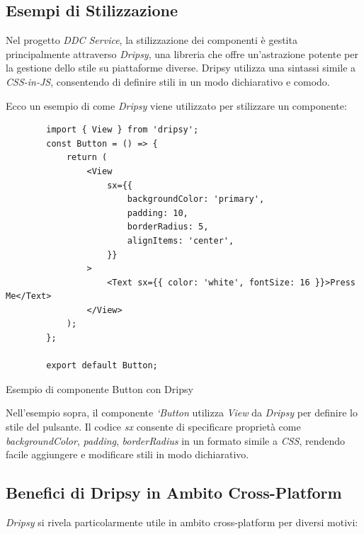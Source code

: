 \subsection{Esempi di Stilizzazione}

Nel progetto \textit{DDC Service}, la stilizzazione dei componenti è gestita principalmente attraverso \textit{Dripsy},
 una libreria che offre un'astrazione potente per la gestione dello stile su piattaforme diverse.
 Dripsy utilizza una sintassi simile a \textit{CSS-in-JS}, consentendo di definire stili in un modo dichiarativo e comodo.

Ecco un esempio di come \textit{Dripsy} viene utilizzato per stilizzare un componente:

\begin{listing}[H]
    \begin{verbatim}
        import { View } from 'dripsy';
        const Button = () => {
            return (
                <View
                    sx={{
                        backgroundColor: 'primary',
                        padding: 10,
                        borderRadius: 5,
                        alignItems: 'center',
                    }}
                >
                    <Text sx={{ color: 'white', fontSize: 16 }}>Press Me</Text>
                </View>
            );
        };

        export default Button;
    \end{verbatim}
    \caption{Esempio di componente Button con Dripsy}
    \label{listing:dripsy_button}
\end{listing}

Nell'esempio sopra, il componente \textit{`Button} utilizza \textit{View} da \textit{Dripsy} per definire lo stile del pulsante. 
Il codice \textit{sx} consente di specificare proprietà come \textit{backgroundColor}, \textit{padding}, \textit{borderRadius} in un formato simile a \textit{CSS}, 
rendendo facile aggiungere e modificare stili in modo dichiarativo.

\subsection{Benefici di Dripsy in Ambito Cross-Platform}

\textit{Dripsy} si rivela particolarmente utile in ambito cross-platform per diversi motivi:

